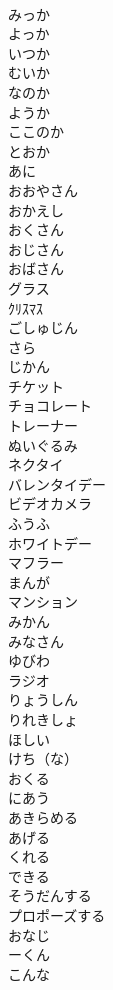 \documentclass[8pt]{extreport}
\begin{document}
\begin{CJK}{UTF8}{min}
\\	みっか	
\\	よっか	
\\	いつか	
\\	むいか	
\\	なのか	
\\	ようか	
\\	ここのか	
\\	とおか	
\\	あに	
\\	おおやさん	
\\	おかえし	
\\	おくさん	
\\	おじさん	
\\	おばさん	
\\	グラス	
\\	ｸﾘｽﾏｽ	
\\	ごしゅじん	
\\	さら	
\\	じかん	
\\	チケット	
\\	チョコレート	
\\	トレーナー	
\\	ぬいぐるみ	
\\	ネクタイ	
\\	バレンタイデー	
\\	ビデオカメラ	
\\	ふうふ	
\\	ホワイトデー	
\\	マフラー	
\\	まんが	
\\	マンション	
\\	みかん	
\\	みなさん	
\\	ゆびわ	
\\	ラジオ	
\\	りょうしん	
\\	りれきしょ	
\\	ほしい	
\\	けち（な）	
\\	おくる	
\\	にあう	
\\	あきらめる	
\\	あげる	
\\	くれる	
\\	できる	
\\	そうだんする	
\\	プロポーズする	
\\	おなじ	
\\	ーくん	
\\	こんな	

\end{CJK}
\end{document}
